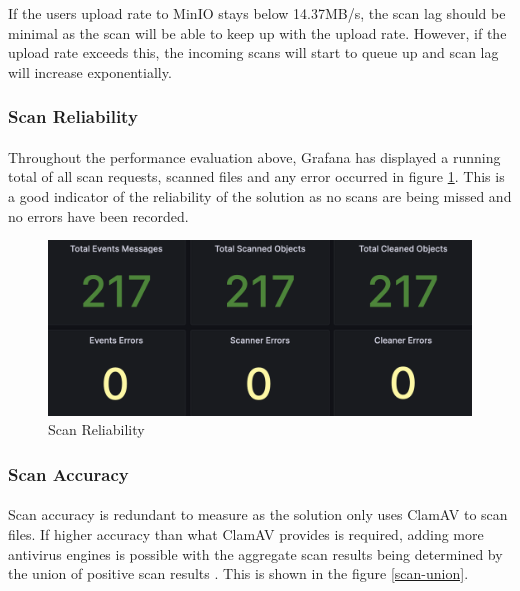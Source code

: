 \documentclass[12pt, conference, final, a4paper, onecolumn, compsoc]{IEEEtran}
\begin{document}
If the users upload rate to MinIO stays below 14.37MB/s, the scan lag should be
minimal as the scan will be able to keep up with the upload rate. However, if
the upload rate exceeds this, the incoming scans will start to queue up and scan
lag will increase exponentially.

\subsubsection*{Scan Reliability}
\paragraph{}
Throughout the performance evaluation above, Grafana has displayed a running
total of all scan requests, scanned files and any error occurred in figure
\ref{fig:scan-reliability}. This is a good indicator of the reliability of the
solution as no scans are being missed and no errors have been recorded.

\begin{figure}
  \centering \includegraphics[scale=0.31]{images/scan-reliability.png}
  \caption{Scan Reliability}
  \label{fig:scan-reliability}
\end{figure}

\subsubsection*{Scan Accuracy}
\paragraph{}
Scan accuracy is redundant to measure as the solution only uses ClamAV to scan
files. If higher accuracy than what ClamAV provides is required, adding more
antivirus engines is possible with the aggregate scan results being determined
by the union of positive scan results \citep{av-comparison}. This is shown in the figure
\ref{scan-union}.
\end{document}
